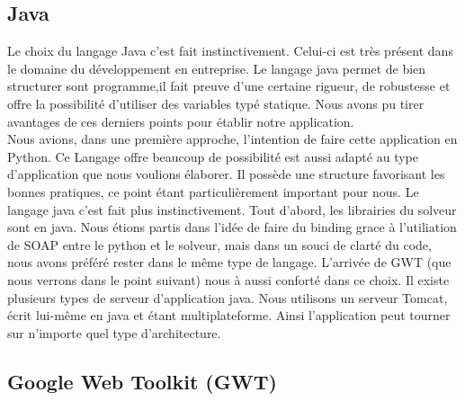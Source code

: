 \subsection{Java}
Le choix du langage Java c'est fait instinctivement. Celui-ci est très présent
dans le domaine du développement en entreprise. Le langage java permet de bien
structurer sont programme,il fait preuve d'une certaine rigueur, de robustesse
et offre la possibilité d'utiliser des variables typé statique. Nous avons pu
tirer avantages de ces derniers points pour établir notre application.\\
Nous avions, dans une première approche, l'intention de faire cette
application en Python. Ce Langage offre beaucoup de possibilité est aussi adapté
au type d'application que nous voulions élaborer. Il possède une structure
favorisant les bonnes pratiques, ce point étant particulièrement important pour
nous. Le langage java c'est fait plus instinctivement. Tout d'abord, les
librairies du solveur sont en java. Nous étions partis dans l'idée de faire du
binding grace à l'utiliation de SOAP entre le python et le solveur, mais
dans un souci de clarté du code, nous avons préféré rester dans le même type de
langage. L'arrivée de GWT (que nous verrons dans le point suivant) nous à aussi
conforté dans ce choix.
Il existe plusieurs types de serveur d'application java. Nous utilisons un
serveur Tomcat, écrit lui-même en java et étant multiplateforme. Ainsi
l'application peut tourner sur n'importe quel type d'architecture.




\subsection{Google Web Toolkit (GWT)}

